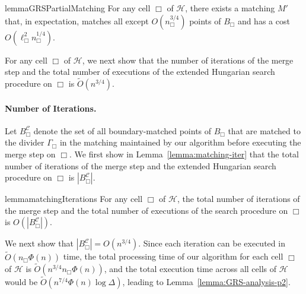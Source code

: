 \documentclass[11pt,onecolumn]{article}
\def\mcC{{\mathcal{C}}}
\def\mcH{{\mathcal{H}}}
\newcommand{\cell}{\Box}
\newcommand{\divider}[1]{\Gamma_{#1}}
\newcommand\myparagraph[1]{\paragraph{#1}}
\begin{document}
\begin{restatable}{lemma}{GRSPartialMatching}\label{lemma:GRS-matching}
    For any cell $\cell$ of $\mcH$, there exists a matching $M'$ that, in expectation, matches all except $O(n_\cell^{3/4})$ points of $B_\cell$ and has a cost $O(\ell_\cell^2 n_\cell^{1/4})$.
\end{restatable}










%
%
%

For any cell $\cell$ of $\mcH$, we next show that the number of iterations of the merge step and the total number of executions of the extended Hungarian search procedure on $\cell$ is $\tilde{O}(n^{3/4})$.


\myparagraph{Number of Iterations.} 
Let $B_\cell^\mcC$ denote the set of all boundary-matched points of $B_\cell$ that are matched to the divider $\divider\cell$ in the matching maintained by our algorithm before executing the merge step on $\cell$. We first show in Lemma~\ref{lemma:matching-iter} that the total number of iterations of the merge step and the extended Hungarian search procedure on $\cell$ is $|B_\cell^\mcC|$.



\begin{restatable}{lemma}{matchingIterations}\label{lemma:matching-iter}
    For any cell $\cell$ of $\mcH$, the total number of iterations of the merge step and the total number of executions of the search procedure on $\cell$ is $O(|B_\cell^\mcC|)$.
\end{restatable}





We next show that $|B_\cell^\mcC|=O(n^{3/4})$. 
Since each iteration can be executed in $\tilde{O}(n_\cell\Phi(n))$ time, the total processing time of our algorithm for each cell $\cell$ of $\mcH$ is $\tilde{O}(n^{3/4}n_\cell\Phi(n))$, and the total execution time across all cells of $\mcH$ would be $\tilde{O}(n^{7/4}\Phi(n)\log\Delta)$, leading to Lemma~\ref{lemma:GRS-analysis-p2}.
\end{document}
